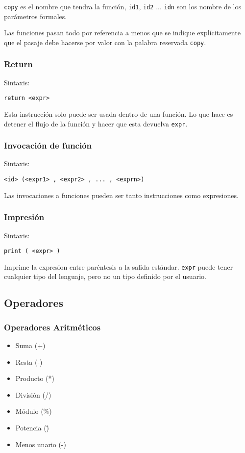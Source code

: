 \documentclass[12pt, spanish]{report}
\begin{document}
\texttt{copy} es el nombre que tendra la funci\'on,
\texttt{id1}, \texttt{id2} ... \texttt{idn} son los nombre de los
par\'ametros formales.

Las funciones pasan todo por referencia a menos que se indique
expl\'icitamente que el pasaje debe hacerse por valor con la palabra
reservada \texttt{copy}.

\subsubsection{Return}
\label{sec:return}
Sintaxis:\\
\begin{verbatim}
return <expr>
\end{verbatim}

Esta instrucci\'on solo puede ser usada dentro de una funci\'on. Lo que
hace es detener el flujo de la funci\'on y hacer que esta devuelva \texttt{expr}.

\subsubsection{Invocaci\'on de funci\'on}
\label{sec:inv}
Sintaxis:\\
\begin{verbatim}
<id> (<expr1> , <expr2> , ... , <exprn>)
\end{verbatim}

Las invocaciones a funciones pueden ser tanto instrucciones como
expresiones.

\subsubsection{Impresi\'on}
Sintaxis:
\begin{verbatim}
print ( <expr> )
\end{verbatim}

Imprime la expresion entre par\'entesis a la salida est\'andar. \texttt{expr}
puede tener cualquier tipo del lenguaje, pero no un tipo definido por el usuario.

\subsection{Operadores}
\label{sec:ops}

\subsubsection{Operadores Aritm\'eticos}
\begin{itemize}
\item Suma     (+)
\item Resta    (-)
\item Producto (*)
\item Divisi\'on  (/)
\item M\'odulo (\%)
\item Potencia (\^)
\item Menos unario (-)
\end{itemize}
\end{document}
